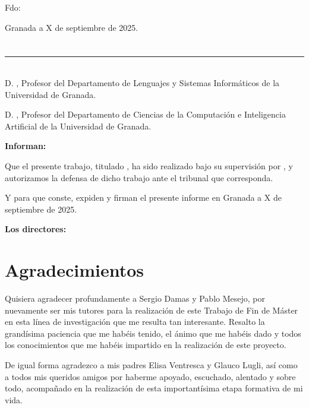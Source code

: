 \vspace{6cm}

\noindent Fdo: \myName

\vspace{2cm}

\begin{flushright}
Granada a X de septiembre de 2025.
\end{flushright}


\chapter*{}
\thispagestyle{empty}

\noindent\rule[-1ex]{\textwidth}{2pt}\\[4.5ex]

D. \textbf{\myProf}, Profesor del Departamento de Lenguajes y Sistemas Informáticos de la Universidad de Granada.

\vspace{0.25cm}

D. \textbf{\myOtherProf}, Profesor del Departamento de Ciencias de la Computación e Inteligencia Artificial de la Universidad de Granada.


\vspace{0.25cm}

\textbf{Informan:}

\vspace{0.25cm}

Que el presente trabajo, titulado \textit{\textbf{\myTitle}},
ha sido realizado bajo su supervisión por \textbf{\myName}, y autorizamos la defensa de dicho trabajo ante el tribunal
que corresponda.

\vspace{0.5cm}

Y para que conste, expiden y firman el presente informe en Granada a X de septiembre de 2025.

\vspace{0.5cm}

\textbf{Los directores:}

\vspace{5cm}

\noindent \textbf{\myProf \hfill
\myOtherProf}

\chapter*{Agradecimientos}
\thispagestyle{empty}

\vspace{1cm}

Quisiera agradecer profundamente a Sergio Damas y Pablo Mesejo, por nuevamente ser mis tutores para la realización de este Trabajo de Fin de Máster en esta línea de investigación que me resulta tan interesante. Resalto la grandísima paciencia que me habéis tenido, el ánimo que me habéis dado y todos los conocimientos que me habéis impartido en la realización de este proyecto.

De igual forma agradezco a mis padres Elisa Ventresca y Glauco Lugli, así como a todos mis queridos amigos por haberme apoyado, escuchado, alentado y sobre todo, acompañado en la realización de esta importantísima etapa formativa de mi vida.
